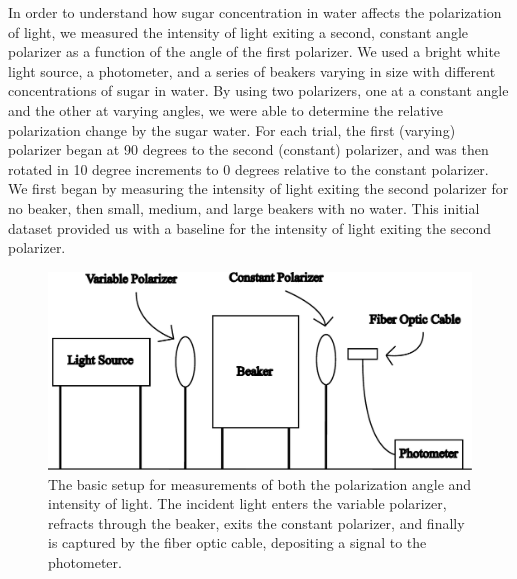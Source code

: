 
In order to understand how sugar concentration in water affects the polarization of light, we measured the intensity of light exiting a second, constant angle polarizer as a function of the angle of the first polarizer. We used a bright white light source, a photometer, and a series of beakers varying in size with different concentrations of sugar in water. By using two polarizers, one at a constant angle and the other at varying angles, we were able to determine the relative polarization change by the sugar water. For each trial, the first (varying) polarizer began at 90 degrees to the second (constant) polarizer, and was then rotated in 10 degree increments to 0 degrees relative to the constant polarizer. We first began by measuring the intensity of light exiting the second polarizer for no beaker, then small, medium, and large beakers with no water. This initial dataset provided us with a baseline for the intensity of light exiting the second polarizer.

\begin{figure}[H]
\centering
\includegraphics[scale=0.4]{../figures/setup.pdf}
\caption{The basic setup for measurements of both the polarization angle and intensity of light. The incident light enters the variable polarizer, refracts through the beaker, exits the constant polarizer, and finally is captured by the fiber optic cable, depositing a signal to the photometer.}
\end{figure}

